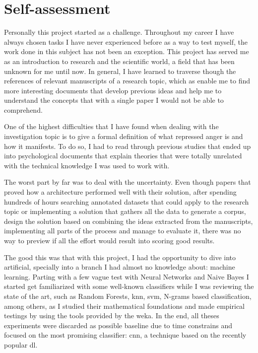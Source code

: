 \chapter{Self-assessment}

Personally this project started as a challenge. Throughout my career I have always chosen tasks I have never experienced before as a way to test myself, the work done in this subject has not been an exception. This project has served me as an introduction to research and the scientific world, a field that has been unknown for me until now. In general, I have learned to traverse though the references of relevant manuscripts of a research topic, which as enable me to find more interesting documents that develop previous ideas and help me to understand the concepts that with a single paper I would not be able to comprehend.

One of the highest difficulties that I have found when dealing with the investigation topic is to give a formal definition of what repressed anger is and how it manifests. To do so, I had to read through previous studies that ended up into psychological documents that explain theories that were totally unrelated with the technical knowledge I was used to work with. 

The worst part by far was to deal with the uncertainty. Even though papers that proved how a architecture performed well with their solution, after spending hundreds of hours searching annotated datasets that could apply to the research topic or implementing a solution that gathers all the data to generate a corpus, design the solution based on combining the ideas extracted from the manuscripts, implementing all parts of the process and manage to evaluate it, there was no way to preview if all the effort would result into scoring good results.

The good this was that with this project, I had the opportunity to dive into artificial, specially into a branch I had almost no knowledge about: machine learning. Parting with a few vague test with Neural Networks and Naive Bayes I started get familiarized with some well-known classifiers while I was reviewing the state of the art, such as Random Forests, \acrshort{knn}, \acrshort{svm}, N-grams based classification, among others, as I studied their mathematical foundations and made empirical testings by using the tools provided by the \acrfull{weka}. In the end, all theses experiments were discarded as possible baseline due to time constrains and focused on the most promising classifier: \acrlong{cnn}, a technique based on the recently popular \acrlong{dl}.

